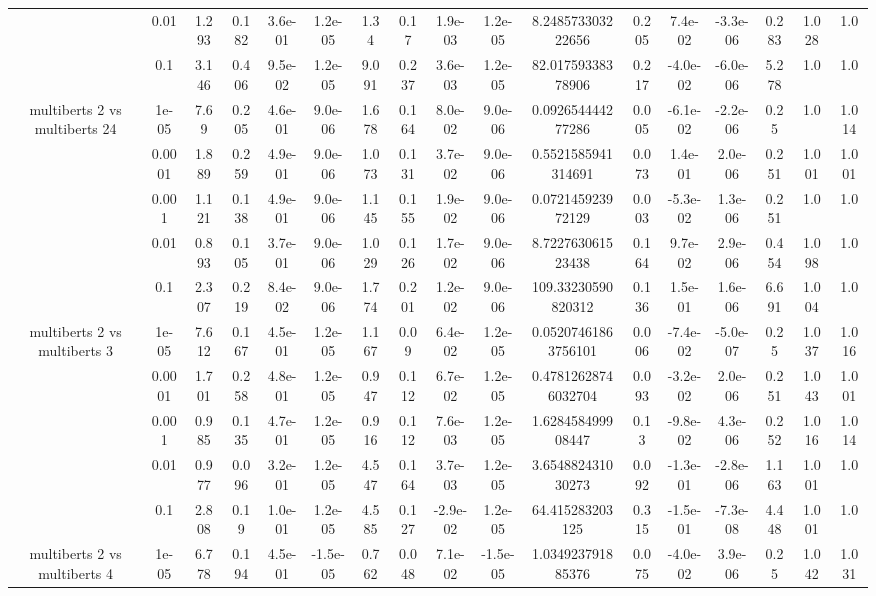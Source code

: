 \begin{tabular}{|c|c|c|c|c|c|c|c|c|c|c|c|c|c|c|c|c|}
 & 0.01 & 1.293 & 0.182 & 3.6e-01 & 1.2e-05 & 1.34 & 0.17 & 1.9e-03 & 1.2e-05 & 8.248573303222656 & 0.205 & 7.4e-02 & -3.3e-06 & 0.283 & 1.028 & 1.0 \\
 & 0.1 & 3.146 & 0.406 & 9.5e-02 & 1.2e-05 & 9.091 & 0.237 & 3.6e-03 & 1.2e-05 & 82.01759338378906 & 0.217 & -4.0e-02 & -6.0e-06 & 5.278 & 1.0 & 1.0 \\
\hline
\multirow{5}{*}{multiberts 2 vs multiberts 24} & 1e-05 & 7.69 & 0.205 & 4.6e-01 & 9.0e-06 & 1.678 & 0.164 & 8.0e-02 & 9.0e-06 & 0.092654444277286 & 0.005 & -6.1e-02 & -2.2e-06 & 0.25 & 1.0 & 1.014 \\
 & 0.0001 & 1.889 & 0.259 & 4.9e-01 & 9.0e-06 & 1.073 & 0.131 & 3.7e-02 & 9.0e-06 & 0.5521585941314691 & 0.073 & 1.4e-01 & 2.0e-06 & 0.251 & 1.001 & 1.001 \\
 & 0.001 & 1.121 & 0.138 & 4.9e-01 & 9.0e-06 & 1.145 & 0.155 & 1.9e-02 & 9.0e-06 & 0.072145923972129 & 0.003 & -5.3e-02 & 1.3e-06 & 0.251 & 1.0 & 1.0 \\
 & 0.01 & 0.893 & 0.105 & 3.7e-01 & 9.0e-06 & 1.029 & 0.126 & 1.7e-02 & 9.0e-06 & 8.722763061523438 & 0.164 & 9.7e-02 & 2.9e-06 & 0.454 & 1.098 & 1.0 \\
 & 0.1 & 2.307 & 0.219 & 8.4e-02 & 9.0e-06 & 1.774 & 0.201 & 1.2e-02 & 9.0e-06 & 109.33230590820312 & 0.136 & 1.5e-01 & 1.6e-06 & 6.691 & 1.004 & 1.0 \\
\hline
\multirow{5}{*}{multiberts 2 vs multiberts 3} & 1e-05 & 7.612 & 0.167 & 4.5e-01 & 1.2e-05 & 1.167 & 0.09 & 6.4e-02 & 1.2e-05 & 0.05207461863756101 & 0.006 & -7.4e-02 & -5.0e-07 & 0.25 & 1.037 & 1.016 \\
 & 0.0001 & 1.701 & 0.258 & 4.8e-01 & 1.2e-05 & 0.947 & 0.112 & 6.7e-02 & 1.2e-05 & 0.47812628746032704 & 0.093 & -3.2e-02 & 2.0e-06 & 0.251 & 1.043 & 1.001 \\
 & 0.001 & 0.985 & 0.135 & 4.7e-01 & 1.2e-05 & 0.916 & 0.112 & 7.6e-03 & 1.2e-05 & 1.628458499908447 & 0.13 & -9.8e-02 & 4.3e-06 & 0.252 & 1.016 & 1.014 \\
 & 0.01 & 0.977 & 0.096 & 3.2e-01 & 1.2e-05 & 4.547 & 0.164 & 3.7e-03 & 1.2e-05 & 3.654882431030273 & 0.092 & -1.3e-01 & -2.8e-06 & 1.163 & 1.001 & 1.0 \\
 & 0.1 & 2.808 & 0.19 & 1.0e-01 & 1.2e-05 & 4.585 & 0.127 & -2.9e-02 & 1.2e-05 & 64.415283203125 & 0.315 & -1.5e-01 & -7.3e-08 & 4.448 & 1.001 & 1.0 \\
\hline
\multirow{5}{*}{multiberts 2 vs multiberts 4} & 1e-05 & 6.778 & 0.194 & 4.5e-01 & -1.5e-05 & 0.762 & 0.048 & 7.1e-02 & -1.5e-05 & 1.034923791885376 & 0.075 & -4.0e-02 & 3.9e-06 & 0.25 & 1.042 & 1.031 \\

\end{tabular}
